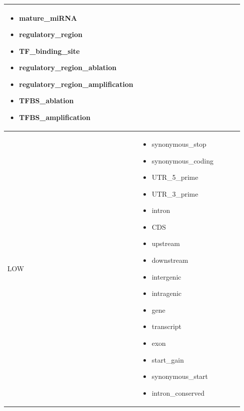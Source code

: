 \documentclass[letterpaper,10pt,english]{sphinxmanual}
\begin{document}
\begin{tabular}{|p{0.475\linewidth}|p{0.475\linewidth}|}
\begin{itemize}
\item {} 
mature\_miRNA

\item {} 
regulatory\_region

\item {} 
TF\_binding\_site

\item {} 
regulatory\_region\_ablation

\item {} 
regulatory\_region\_amplification

\item {} 
TFBS\_ablation

\item {} 
TFBS\_amplification

\end{itemize}
\\\hline

LOW
 & \begin{itemize}
\item {} 
synonymous\_stop

\item {} 
synonymous\_coding

\item {} 
UTR\_5\_prime

\item {} 
UTR\_3\_prime

\item {} 
intron

\item {} 
CDS

\item {} 
upstream

\item {} 
downstream

\item {} 
intergenic

\item {} 
intragenic

\item {} 
gene

\item {} 
transcript

\item {} 
exon

\item {} 
start\_gain

\item {} 
synonymous\_start

\item {} 
intron\_conserved


\end{itemize}
\end{tabular}
\end{document}
